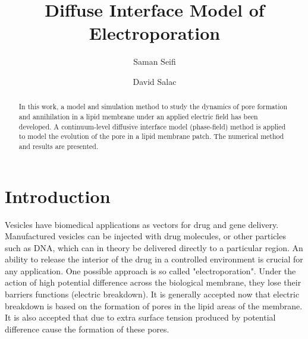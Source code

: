 \documentclass[english,12pt]{article}
\begin{document}
\title{Diffuse Interface Model of Electroporation}

\author{Saman Seifi}
\author{David Salac}

\date{}

\maketitle

\begin{abstract}
In this work, a model and simulation method to study the dynamics of pore formation and annihilation in a lipid membrane under an applied electric field has been developed. A continuum-level diffusive interface model (phase-field) method is applied to model the evolution of the pore in a lipid membrane patch. The numerical method and results are presented.	
\end{abstract}


\section{Introduction}

Vesicles have biomedical applications as vectors for drug and gene delivery. Manufactured vesicles can be injected with drug molecules, or other particles such as DNA, which can in theory be delivered directly to a particular region.
An ability to release the interior of the drug in a controlled environment is crucial for any application. One possible approach is so called "electroporation". Under the action of high potential difference across the biological membrane, they lose their barriers functions (electric breakdown). It is generally accepted now that electric breakdown is based on the formation of pores in the lipid areas of the membrane. It is also accepted that due to extra surface tension produced by potential difference cause the formation of these pores.
 
\end{document}
